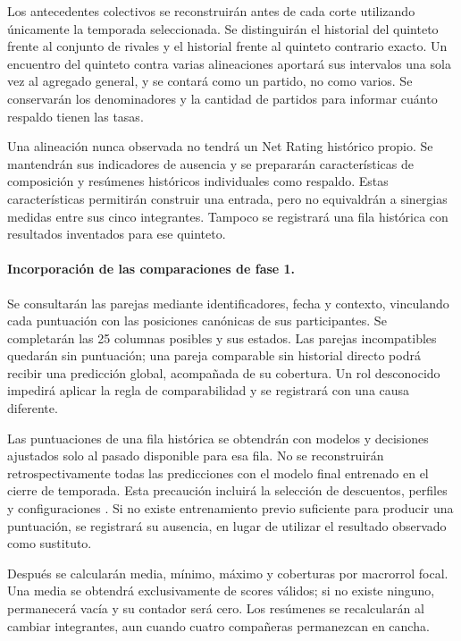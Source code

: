 Los antecedentes colectivos se reconstruirán antes de cada corte utilizando únicamente la temporada seleccionada. Se distinguirán el historial del quinteto frente al conjunto de rivales y el historial frente al quinteto contrario exacto. Un encuentro del quinteto contra varias alineaciones aportará sus intervalos una sola vez al agregado general, y se contará como un partido, no como varios. Se conservarán los denominadores y la cantidad de partidos para informar cuánto respaldo tienen las tasas.

Una alineación nunca observada no tendrá un Net Rating histórico propio. Se mantendrán sus indicadores de ausencia y se prepararán características de composición y resúmenes históricos individuales como respaldo. Estas características permitirán construir una entrada, pero no equivaldrán a sinergias medidas entre sus cinco integrantes. Tampoco se registrará una fila histórica con resultados inventados para ese quinteto.

\paragraph*{Incorporación de las comparaciones de fase 1.}
Se consultarán las parejas mediante identificadores, fecha y contexto, vinculando cada puntuación con las posiciones canónicas de sus participantes. Se completarán las 25 columnas posibles y sus estados. Las parejas incompatibles quedarán sin puntuación; una pareja comparable sin historial directo podrá recibir una predicción global, acompañada de su cobertura. Un rol desconocido impedirá aplicar la regla de comparabilidad y se registrará con una causa diferente.

Las puntuaciones de una fila histórica se obtendrán con modelos y decisiones ajustados solo al pasado disponible para esa fila. No se reconstruirán retrospectivamente todas las predicciones con el modelo final entrenado en el cierre de temporada. Esta precaución incluirá la selección de descuentos, perfiles y configuraciones \cite{cawley2010selection,sklearnCommonPitfallsPonderacion}. Si no existe entrenamiento previo suficiente para producir una puntuación, se registrará su ausencia, en lugar de utilizar el resultado observado como sustituto.

Después se calcularán media, mínimo, máximo y coberturas por macrorrol focal. Una media se obtendrá exclusivamente de scores válidos; si no existe ninguno, permanecerá vacía y su contador será cero. Los resúmenes se recalcularán al cambiar integrantes, aun cuando cuatro compañeras permanezcan en cancha.

